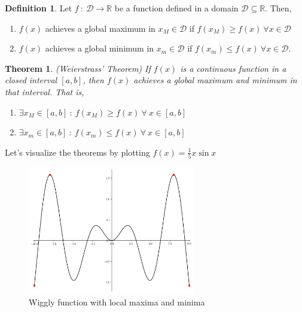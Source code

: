 \documentclass[a4paper,11pt]{article}
\theoremstyle{definition}
\newtheorem{definition}{Definition}
\theoremstyle{plain}
\newtheorem{theorem}{Theorem}
\begin{document}
            
\begin{definition} 
Let \(f \ : \ \mathcal{D} \rightarrow \mathbb{R}\)
be a function defined in a domain \(\mathcal{D}\subseteq\mathbb{R}\).
Then, 
\begin{enumerate}
	\item \(f(x)\) achieves a global maximum in \(x_M\in\mathcal{D}\) if
\(f(x_M) \geq f(x) \ \forall x\in\mathcal{D}\) 	
	\item \(f(x)\) achieves a global minimum in \(x_m\in\mathcal{D}\) if
\(f(x_m) \leq f(x) \ \forall x\in\mathcal{D}\).
\end{enumerate}
\end{definition}

\begin{theorem}{(Weierstrass' Theorem)} If \(f(x)\) is a continuous
function in a closed interval \([a,b]\), then \(f(x)\) achieves a global
maximum and minimum in that interval. That is,
\end{theorem}

\begin{enumerate}
\def\labelenumi{\arabic{enumi}.}
\item
  \(\exists x_M \in [a,b] \ : \ f(x_M) \geq f(x) \ \forall \ x\in[a,b]\)
\item
  \(\exists x_m \in [a,b] \ : \ f(x_m) \leq f(x) \ \forall \ x\in[a,b]\)
\end{enumerate}

Let's visualize the theorems by plotting \(f(x) = \frac{1}{5}x\sin{x}\)

    \begin{figure}[htbp]
    	\centering 
    		\includegraphics[width = 0.65\textwidth]{Ch1_files/Ch1_31_0.png}
    		\caption{Wiggly function with local maxima and minima}
    		\label{fig:weierstrass_thm}
    \end{figure}
    
\end{document}
